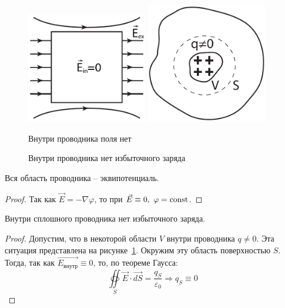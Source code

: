     \begin{figure}[!b]
        \center
        \includegraphics[width=0.47\textwidth]{lec04/solid_conductor.pdf}
        \hfill
        \includegraphics[width=0.47\textwidth]{lec04/solid_conductor_w-o_q.pdf}
        \parbox[t]{.47\textwidth}{
            \caption{Внутри проводника поля нет}
            \label{4:solid_conductor}
        }
        \hfill
        \parbox[t]{.47\textwidth}{
            \caption{Внутри проводника нет избыточного заряда}
            \label{4:conductor_w-o_q}
        }
    \end{figure}

    \begin{corollary}
        Вся область проводника -- эквипотенциаль.
    \end{corollary}
    \begin{proof}
         Так как \( \vec{E} = -\nabla\varphi \), то при
         \( \vec{E} \equiv 0,\ \varphi = \mathrm{const} \).
    \end{proof}


    \begin{corollary}
        Внутри сплошного проводника нет избыточного заряда.
    \end{corollary}
    \begin{proof}
        Допустим, что в некоторой области \( V \) внутри проводника
        \( q \ne 0 \). Эта ситуация представлена на
        рисунке~\ref{4:conductor_w-o_q}. Окружим эту область поверхностью
        \( S \). Тогда, так как \( \vec{E_{\textit{внутр}}} \equiv 0 \), то, по 
        теореме Гаусса:
        \[
            \oiint\limits_S \vec{E}\cdot\vec{dS} = \frac{q_S}{\varepsilon_0} 
            \Rightarrow q_S \equiv 0 \nonumber
        \]
    \end{proof}

